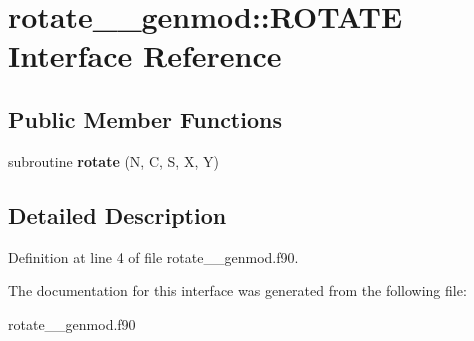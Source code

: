 \hypertarget{interfacerotate____genmod_1_1_r_o_t_a_t_e}{\section{rotate\+\_\+\+\_\+genmod\+:\+:R\+O\+T\+A\+T\+E Interface Reference}
\label{interfacerotate____genmod_1_1_r_o_t_a_t_e}
}
\subsection*{Public Member Functions}
\begin{DoxyCompactItemize}
\item 
\hypertarget{interfacerotate____genmod_1_1_r_o_t_a_t_e_a5ac585b7e726ac636938a305f60b432a}{subroutine {\bfseries rotate} (N, C, S, X, Y)}\label{interfacerotate____genmod_1_1_r_o_t_a_t_e_a5ac585b7e726ac636938a305f60b432a}

\end{DoxyCompactItemize}


\subsection{Detailed Description}


Definition at line 4 of file rotate\+\_\+\+\_\+genmod.\+f90.



The documentation for this interface was generated from the following file\+:\begin{DoxyCompactItemize}
\item 
rotate\+\_\+\+\_\+genmod.\+f90\end{DoxyCompactItemize}
